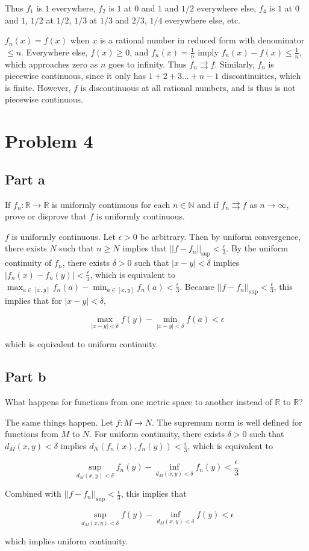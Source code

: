 \documentclass{article}
\newcommand{\R}{\mathbb{R}}
\newcommand{\N}{\mathbb{N}}
\begin{document}
Thus $f_1$ is $1$ everywhere, $f_2$ is $1$ at $0$ and $1$ and $1/2$ everywhere else, $f_4$ is $1$ at $0$ and $1$, $1/2$ at $1/2$, $1/3$ at $1/3$ and $2/3$, $1/4$ everywhere else, etc.

$f_n(x) = f(x)$ when $x$ is a rational number in reduced form with denominator $\leq n$. Everywhere else, $f(x) \geq 0$, and $f_n(x) = \frac{1}{n}$ imply $f_n(x) - f(x) \leq \frac{1}{n}$, which approaches zero as $n$ goes to infinity. Thus $f_n \rightrightarrows f$. Similarly, $f_n$ is piecewise continuous, since it only has $1 + 2 + 3 \dots + n-1$ discontinuities, which is finite. However, $f$ is discontinuous at all rational numbers, and is thus is not piecewise continuous.

\section*{Problem 4}

\subsection*{Part a}

If $f_n: \R \rightarrow \R$ is uniformly continuous for each $n \in \N$ and if $f_n \rightrightarrows f$ as $n \rightarrow \infty$, prove or disprove that $f$ is uniformly continuous.

$f$ is uniformly continuous. Let $\epsilon > 0$ be arbitrary. Then by uniform convergence, there exists $N$ such that $n \geq N$ implies that $||f - f_n||_{\sup} < \frac{\epsilon}{3}$. By the uniform continuity of $f_n$, there exists $\delta > 0$ such that $|x - y| < \delta$ implies $|f_n(x) - f_n(y)| < \frac{\epsilon}{3}$, which is equivalent to $\max_{a \in [x, y]} f_n(a) - \min_{a \in [x, y]} f_n(a) < \frac{\epsilon}{3}$. Because $||f - f_n||_{\sup} < \frac{\epsilon}{3}$, this implies that for $|x-y| < \delta$,

\[
\max_{|x-y| < \delta} f(y) - \min_{|x-y| < \delta} f(a) < \epsilon
\]

which is equivalent to uniform continuity.

\subsection*{Part b}

What happens for functions from one metric space to another instead of $\R$ to $\R$?

The same things happen. Let $f: M \rightarrow N$. The supremum norm is well defined for functions from $M$ to $N$. For uniform continuity, there exists $\delta > 0$ such that $d_M(x, y) < \delta$ implies $d_N(f_n(x), f_n(y)) < \frac{\epsilon}{3}$, which is equivalent to

\[
\sup_{d_M(x, y) < \delta} f_n(y) - \inf_{d_M(x, y) < \delta} f_n(y) < \frac{\epsilon}{3}
\]

Combined with $||f - f_n||_{\sup} < \frac{\epsilon}{3}$, this implies that

\[
\sup_{d_M(x, y) < \delta} f(y) - \inf_{d_M(x, y) < \delta} f(y) < \epsilon
\]

which implies uniform continuity.
\end{document}
